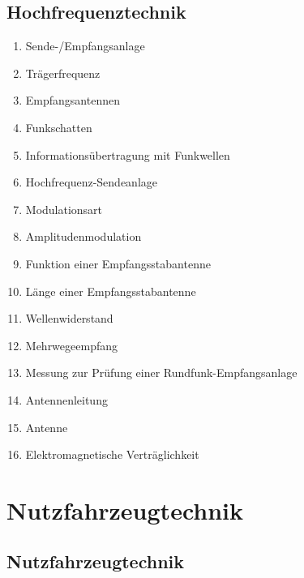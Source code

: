 \subsection{Hochfrequenztechnik}\label{hochfrequenztechnik}

\begin{enumerate}
\item
  Sende-/Empfangsanlage\\
\item
  Trägerfrequenz\\
\item
  Empfangsantennen\\
\item
  Funkschatten\\
\item
  Informationsübertragung mit Funkwellen\\
\item
  Hochfrequenz-Sendeanlage\\
\item
  Modulationsart\\
\item
  Amplitudenmodulation\\
\item
  Funktion einer Empfangsstabantenne\\
\item
  Länge einer Empfangsstabantenne\\
\item
  Wellenwiderstand\\
\item
  Mehrwegeempfang\\
\item
  Messung zur Prüfung einer Rundfunk-Empfangsanlage\\
\item
  Antennenleitung\\
\item
  Antenne\\
\item
  Elektromagnetische Verträglichkeit
\end{enumerate}

\section{Nutzfahrzeugtechnik}\label{nutzfahrzeugtechnik}

\subsection{Nutzfahrzeugtechnik}\label{nutzfahrzeugtechnik-1}

